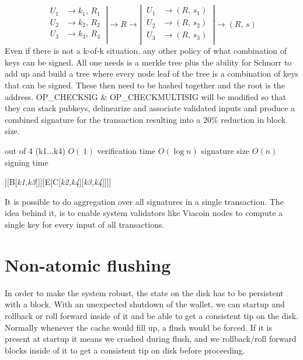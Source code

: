 \documentclass{article}
\begin{document}
\begin{equation}
\left.
    \begin{aligned}
        U_{1} &\rightarrow k_{1},\, R_{1} \\
        U_{2} &\rightarrow k_{2},\, R_{2} \\
        U_{3} &\rightarrow k_{3},\, R_{3} \\
    \end{aligned}
\
\right|
\longrightarrow
R
\longrightarrow
\left|
\
    \begin{aligned}
        U_{1} &\rightarrow (R,\, s_{1}) \\
        U_{2} &\rightarrow (R,\, s_{2}) \\
        U_{3} &\rightarrow (R,\, s_{3}) \\
    \end{aligned}
\
\right|
\longrightarrow
(R,\, s)
\end{equation}
\newline
\noindent Even if there is not a k-of-k situation, any other policy of what combination of
keys can be signed. All one needs is a merkle tree plus the ability for Schnorr
to add up and build a tree where every node leaf of the tree is a combination of
keys that can be signed. These then need to be hashed together and the root is the address.
OP\_CHECKSIG \& OP\_CHECKMULTISIG will be modified so that they can stack
pubkeys, delinearize and associate validated inputs and produce a
combined signature for the transaction resulting into a 20\% reduction in block
size.\newline

\noindent 2 out of 4 (k1...k4)\newline \linebreak
$O(~1)$ verification time\newline
$O(\log{}n)$ signature size\newline
$O(n)$ signing time
\newline \newline \noindent
\begin{forest}
    [Root[D[A[\textit{k1,k2}]][B[\textit{k1,k3}]]][E[C[\textit{k2,k4}][\textit{k3,k4}]]]]
\end{forest}
\newline
It is possible to do aggregation over all signatures in a single transaction. The
idea behind it, is to enable system validators like Viacoin nodes to compute a
single key for every input of all transactions.
\newpage

\section{Non-atomic flushing}\label{Non-atomic flushing}
In order to make the system robust, the state on the disk has to be persistent
with a block. With an unexpected shutdown of the wallet, we can startup and
rollback or roll forward inside of it and be able to get a consistent tip on the disk.
Normally whenever the cache would fill up, a flush would be forced.
If it is present at startup it means we crashed during flush, and we rollback/roll
forward blocks inside of it to get a consistent tip on disk before proceeding.
\end{document}
